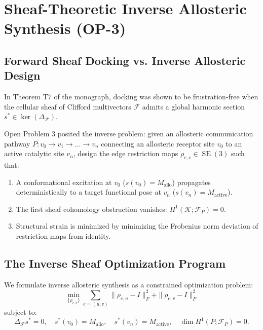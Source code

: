 \documentclass[11pt, a4paper]{article}
\theoremstyle{definition}
\theoremstyle{plain}
\theoremstyle{remark}
\begin{document}
\section{Sheaf-Theoretic Inverse Allosteric Synthesis (OP-3)}
\label{sec:inverse_allostery}

\subsection{Forward Sheaf Docking vs. Inverse Allosteric Design}
In Theorem T7 of the monograph, docking was shown to be frustration-free when the cellular sheaf of Clifford multivectors $\mathcal{F}$ admits a global harmonic section $s^* \in \ker(\Delta_{\mathcal{F}})$. 

Open Problem 3 posited the inverse problem: given an allosteric communication pathway $P: v_0 \to v_1 \to \dots \to v_n$ connecting an allosteric receptor site $v_0$ to an active catalytic site $v_n$, design the edge restriction maps $\rho_{e,v} \in \operatorname{SE}(3)$ such that:
\begin{enumerate}
    \item A conformational excitation at $v_0$ ($s(v_0) = M_{\text{allo}}$) propagates deterministically to a target functional pose at $v_n$ ($s(v_n) = M_{\text{active}}$).
    \item The first sheaf cohomology obstruction vanishes: $H^1(\mathcal{K}; \mathcal{F}_P) = 0$.
    \item Structural strain is minimized by minimizing the Frobenius norm deviation of restriction maps from identity.
\end{enumerate}

\subsection{The Inverse Sheaf Optimization Program}
We formulate inverse allosteric synthesis as a constrained optimization problem:
\begin{equation}
    \min_{\{\rho_{e,v}\}} \sum_{e=(u,v)} \|\rho_{e,u} - I\|_F^2 + \|\rho_{e,v} - I\|_F^2
\end{equation}
subject to:
\begin{equation}
    \Delta_{\mathcal{F}} s^* = 0, \quad s^*(v_0) = M_{\text{allo}}, \quad s^*(v_n) = M_{\text{active}}, \quad \dim H^1(P; \mathcal{F}_P) = 0.
\end{equation}
\end{document}
